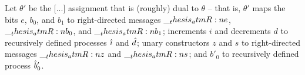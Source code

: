 Let $\theta'$ be the [...] assignment that is (roughly) dual to $\theta$ -- that is, $\theta'$ maps the bits $e$, $b_0$, and $b_1$ to right-directed messages $\__thesis_atmR:n {e}$, $\__thesis_atmR:n {b}_0$, and $\__thesis_atmR:n {b}_1$; increments $i$ and decrements $d$ to recursively defined processes $\hat{\imath}$ and $\hat{d}$; unary constructors $z$ and $s$ to right-directed messages $\__thesis_atmR:n {z}$ and $\__thesis_atmR:n {s}$; and $b'_0$ to recursively defined process $\hat{b}'_0$.%

